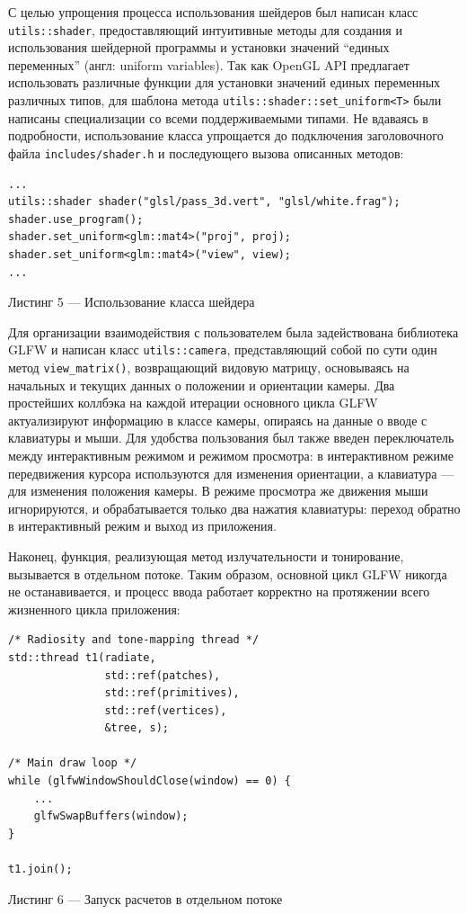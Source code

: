 \documentclass[12pt]{article}
\begin{document}
С целью упрощения процесса использования шейдеров был написан класс \texttt{utils::shader}, предоставляющий интуитивные методы для создания и использования шейдерной программы и установки значений ``единых переменных'' (англ: uniform variables). Так как OpenGL API предлагает использовать различные функции для установки значений единых переменных различных типов, для шаблона метода \texttt{utils::shader::set\_uniform<T>} были написаны специализации со всеми поддерживаемыми типами. Не вдаваясь в подробности, использование класса упрощается до подключения заголовочного файла \texttt{includes/shader.h} и последующего вызова описанных методов:
\begin{lstlisting}
...
utils::shader shader("glsl/pass_3d.vert", "glsl/white.frag");
shader.use_program();
shader.set_uniform<glm::mat4>("proj", proj);
shader.set_uniform<glm::mat4>("view", view);
...
\end{lstlisting}
\begin{center}Листинг 5 --- Использование класса шейдера\end{center}

Для организации взаимодействия с пользователем была задействована библиотека GLFW и написан класс \texttt{utils::camera}, представляющий собой по сути один метод \texttt{view\_matrix()}, возвращающий видовую матрицу, основываясь на начальных и текущих данных о положении и ориентации камеры. Два простейших коллбэка на каждой итерации основного цикла GLFW актуализируют информацию в классе камеры, опираясь на данные о вводе с клавиатуры и мыши. Для удобства пользования был также введен переключатель между интерактивным режимом и режимом просмотра: в интерактивном режиме передвижения курсора используются для изменения ориентации, а клавиатура --- для изменения положения камеры. В режиме просмотра же движения мыши игнорируются, и обрабатывается только два нажатия клавиатуры: переход обратно в интерактивный режим и выход из приложения.

Наконец, функция, реализующая метод излучательности и тонирование, вызывается в отдельном потоке. Таким образом, основной цикл GLFW никогда не останавивается, и процесс ввода работает корректно на протяжении всего жизненного цикла приложения:
\begin{lstlisting}
/* Radiosity and tone-mapping thread */
std::thread t1(radiate,
               std::ref(patches),
               std::ref(primitives),
               std::ref(vertices),
               &tree, s);

/* Main draw loop */
while (glfwWindowShouldClose(window) == 0) {
    ...
    glfwSwapBuffers(window);
}

t1.join();
\end{lstlisting}
\begin{center}Листинг 6 --- Запуск расчетов в отдельном потоке\end{center}
\end{document}
